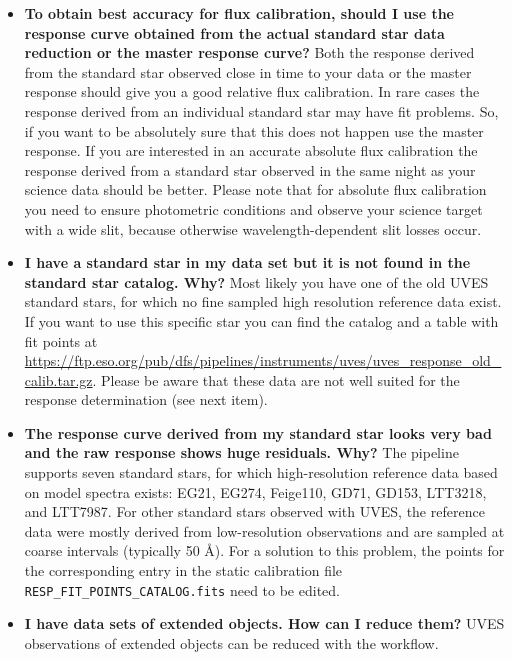 \begin{itemize}
    \item \textbf{To obtain best accuracy for flux calibration,
    should I use the response curve obtained from the actual standard star data reduction or the master response curve?}
    Both the response derived from the standard
    star observed close in time to your data or the master response should give you a good relative flux
    calibration. 
    In rare cases the response derived from an individual standard star may have fit problems.
    So, if you want to be absolutely sure that this does not happen use the master response.
    If you are interested in an accurate absolute flux calibration the response derived from a 
    standard star observed in
    the same night as your science data should be better. 
    Please note that for absolute flux calibration you
    need to ensure photometric conditions and observe your science target with a wide slit, 
    because otherwise wavelength-dependent slit losses occur.
    \item \textbf{I have a standard star in my data set but it is not found in the standard star catalog.
    Why?} 
    Most likely you have one of the old UVES standard stars, for which no fine sampled high resolution 
    reference data exist. If you want to use this specific star you can find the catalog and a 
    table with fit points at
    \hyperlink{https://ftp.eso.org/pub/dfs/pipelines/instruments/uves/uves_response_old_calib.tar.gz}{https://ftp.eso.org/pub/dfs/pipelines/instruments/uves/uves\_response\_old\_calib.tar.gz}. 
    Please be aware
    that these data are not well suited for the response determination (see next item).
    \item \textbf{The response curve derived from my standard star looks very bad and 
    the raw response shows huge residuals. Why?} 
    The pipeline supports seven standard stars, for which high-resolution reference
    data based on model spectra exists: EG21, EG274, Feige110, GD71, GD153, LTT3218, and LTT7987.
    For other standard stars observed with UVES, 
    the reference data were mostly derived from low-resolution
    observations and are sampled at coarse intervals (typically 50 {\AA}).
    For a solution to this problem, the points for the corresponding entry
    in the static calibration file {\tt RESP\_FIT\_POINTS\_CATALOG.fits} need to be edited.
    \item \textbf{I have data sets of extended objects. How can I reduce them?} 
    UVES observations of extended objects can be reduced with the workflow. 

\end{itemize}
